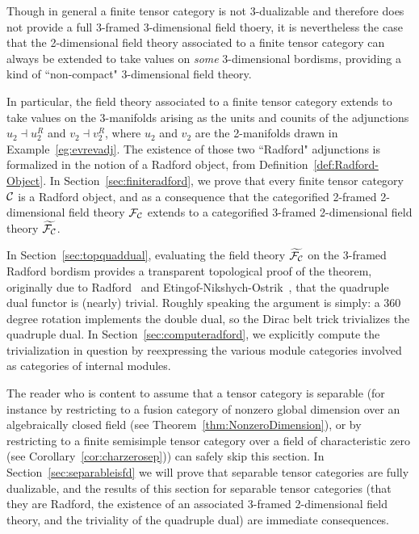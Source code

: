 \documentclass{amsart}
\begin{document}
Though in general a finite tensor category is not 3-dualizable and therefore does not provide a full 3-framed 3-dimensional field thoery, it is nevertheless the case that the 2-dimensional field theory associated to a finite tensor category can always be extended to take values on \emph{some} 3-dimensional bordisms, providing a kind of ``non-compact" 3-dimensional field theory.  

In particular, the field theory associated to a finite tensor category extends to take values on the 3-manifolds arising as the units and counits of the adjunctions $u_2 \dashv u_2^R$ and $v_2 \dashv v_2^R$, where $u_2$ and $v_2$ are the 2-manifolds drawn in Example~\ref{eg:evrevadj}.  The existence of those two ``Radford" adjunctions is formalized in the notion of a Radford object, from Definition~\ref{def:Radford-Object}.  In Section~\ref{sec:finiteradford}, we prove that every finite tensor category $\mathcal C$ is a Radford object, and as a consequence that the categorified 2-framed 2-dimensional field theory $\mathcal F_\mathcal C$ extends to a categorified 3-framed 2-dimensional field theory $\widetilde{\mathcal F_\mathcal C}$.  

In Section~\ref{sec:topquaddual}, evaluating the field theory $\widetilde{\mathcal F_\mathcal C}$ on the 3-framed Radford bordism provides a transparent topological proof of the theorem, originally due to Radford~\cite{MR0407069} and Etingof-Nikshych-Ostrik~\cite{MR2097289}, that the quadruple dual functor is (nearly) trivial.  Roughly speaking the argument is simply: a 360 degree rotation implements the double dual, so the Dirac belt trick trivializes the quadruple dual.  In Section~\ref{sec:computeradford}, we explicitly compute the trivialization in question by reexpressing the various module categories involved as categories of internal modules.

The reader who is content to assume that a tensor category is separable (for instance by restricting to a fusion category of nonzero global dimension over an algebraically closed field (see Theorem~\ref{thm:NonzeroDimension}), or by restricting to a finite semisimple tensor category over a field of characteristic zero (see Corollary~\ref{cor:charzerosep})) can safely skip this section.  In Section~\ref{sec:separableisfd} we will prove that separable tensor categories are fully dualizable, and the results of this section for separable tensor categories (that they are Radford, the existence of an associated 3-framed 2-dimensional field theory, and the triviality of the quadruple dual) are immediate consequences.
\end{document}
